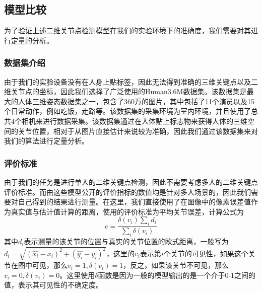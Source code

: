 \subsection{模型比较}
为了验证上述二维关节点检测模型在我们的实验环境下的准确度，我们需要对其进行定量的分析。
\subsubsection{数据集介绍}
由于我们的实验设备没有在人身上贴标签，因此无法得到准确的三维关键点以及二维关节点的坐标，因此我们选择了广泛使用的Human3.6M数据集\cite{ionescu2014human3}。该数据集是最大的人体三维姿态数据集之一，包含了360万的图片，其中包括了11个演员以及15个日常动作，例如吃饭，走路等。该数据集的采集环境为室内环境，并且使用了总共4个相机来进行数据采集。该数据集通过在人体贴上标志物来获得人体的三维空间的关节位置，相对于从图片直接估计来说较为准确，因此我们通过该数据集来对我们的算法进行定量分析。

\subsubsection{评价标准}
由于我们的任务是进行单人的二维关键点检测，因此不需要考虑多人的二维关键点评价标准。而由这些模型公开的评价指标的数值均是针对多人场景的，因此我们需要对自己得到的结果进行测量。在这里，我们直接使用了在图像中的像素误差值作为真实值与估计值计算的距离，使用的评价标准为平均关节误差，计算公式为
\begin{equation}
    e = \frac{\delta(v_i)\sum_i d_i}{\sum_i\delta(v_i)}
\end{equation}
其中\(d_i\)表示测量的该关节的位置与真实的关节位置的欧式距离，一般写为\(d_i = \sqrt{(\hat{x_i} - x_i)^2 + (\hat{y_i} - y_i)^2}\)，这里的\(v_i\)表示第\(i\)个关节的可见性，如果这个关节在图中可见，那么\(v_i = 1, \delta(v_i) = 1\)，反之，如果该关节不可见，那么\(v_i = 0, \delta(v_i) = 0\)。这里使用\(\delta\)函数是因为一般的模型输出的是一个介于0-1之间的值，表示其可见性的不确定度。

